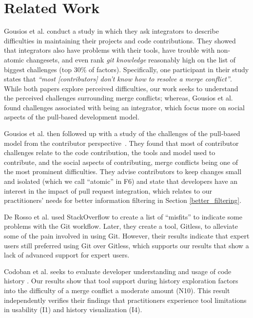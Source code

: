 \section{Related Work}\label{related_work}

Gousios et al. \cite{integrator_perspective} conduct a study in which they ask integrators to describe difficulties in maintaining their projects and code contributions. 
They showed that integrators also have problems with their tools, have trouble with non-atomic changesets, and even rank \textit{git knowledge} reasonably high on the list of biggest challenges (top 30\% of factors). 
Specifically, one participant in their study states that \textit{``most [contributors] don’t know how to resolve a merge conflict''}. 
While both papers explore perceived difficulties, our work seeks to understand the perceived challenges surrounding merge conflicts; whereas, Gousios et al. found challenges associated with being an integrator, which focus more on social aspects of the pull-based development model.

Gousios et al. then followed up with a study of the challenges of the pull-based model from the contributor perspective~\cite{gousios2016work}. 
They found that most of contributor challenges relate to the code contribution, the tools and model used to contribute, and the social aspects of contributing, merge conflicts being one of the most prominent difficulties. 
They advise contributors to keep changes small and isolated (which we call ``atomic'' in F6) and state that developers have an interest in the impact of pull request integration, which relates to our practitioners' needs for better information filtering in Section \ref{better_filtering}.


De Rosso et al. \cite{DeRosso2016} used StackOverflow to create a list of ``misfits'' to indicate some problems with the Git workflow. Later, they create a tool, Gitless, to alleviate some of the pain involved in using Git. However, their results indicate that expert users still preferred using Git over Gitless, which supports our results that show a lack of advanced support for expert users.

Codoban et al. seeks to evaluate developer understanding and usage of code history \cite{Mihai_lenses}. Our results show that tool support during history exploration factors into the difficulty of a merge conflict a moderate amount (N10). This result independently verifies their findings that practitioners experience tool limitations in usability (I1) and history visualization (I4).